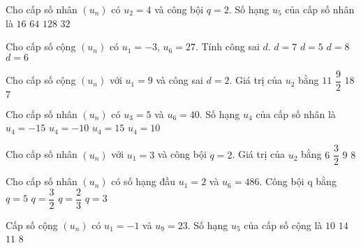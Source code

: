 \begin{ex}
Cho cấp số nhân $(u_n)$ có $u_2=4$ và công bội $q=2$. Số hạng $u_5$ của cấp số nhân là
\choice
{$16$}
{$64$}
{$128$}
{\True $32$}
\end{ex}
\begin{ex}
Cho cấp số cộng $(u_n)$ có $u_1=-3$, $u_6=27$. Tính công sai $d$.
\choice
{$d=7$}
{$d=5$}
{$d=8$}
{\True $d=6$}
\end{ex}
\begin{ex}
Cho cấp số cộng $(u_n)$ với $u_1=9$ và công sai $d=2$. Giá trị của $u_2$ bằng
\choice
{\True $11$}
{$\dfrac{9}{2}$}
{$18$}
{$7$}
\end{ex}
\begin{ex}
Cho cấp số nhân $(u_n)$ có $u_3=5$ và $u_6=40$. Số hạng $u_4$ của cấp số nhân là
\choice
{$u_4=-15$}
{$u_4=-10$}
{$u_4=15$}
{\True $u_4=10$}
\end{ex}
\begin{ex}
Cho cấp số nhân $(u_n)$ với $u_1=3$ và công bội $q=2$. Giá trị của $u_2$ bằng
\choice
{\True $6$}
{$\dfrac{3}{2}$}
{$9$}
{$8$}
\end{ex}
\begin{ex}
Cho cấp số nhân $(u_n)$ có số hạng đầu $u_1=2$ và $u_6=486$. Công bội q bằng
\choice
{$q=5$}
{$q=\dfrac{3}{2}$}
{$q=\dfrac{2}{3}$}
{\True $q=3$}
\end{ex}
\begin{ex}
Cấp số cộng $(u_n)$ có $u_1=-1$ và $u_9=23$. Số hạng $u_5$ của cấp số cộng là
\choice
{$10$}
{$14$}
{\True $11$}
{$8$}
\end{ex}
